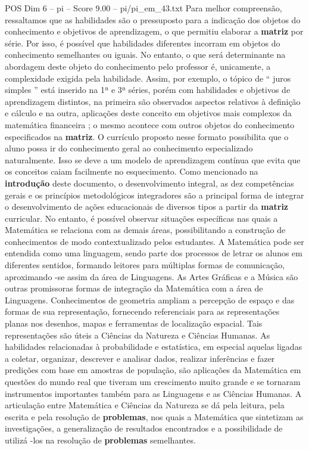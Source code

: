 \begin{textsample}{POS Dim 6 – pi – Score 9.00 – pi/pi\_em\_43.txt}
Para melhor compreensão, ressaltamos que as habilidades são o pressuposto para a indicação dos objetos do conhecimento e objetivos de aprendizagem, o que permitiu elaborar a \textbf{matriz} por série.
Por isso, é possível que habilidades diferentes incorram em objetos do conhecimento semelhantes ou iguais.
No entanto, o que será determinante na abordagem deste objeto do conhecimento pelo professor é, unicamente, a complexidade exigida pela habilidade.
Assim, por exemplo, o tópico de “ juros simples ” está inserido na 1ª e 3ª séries, porém com habilidades e objetivos de aprendizagem distintos, na primeira são observados aspectos relativos à definição e cálculo e na outra, aplicações deste conceito em objetivos mais complexos da matemática financeira ; o mesmo acontece com outros objetos do conhecimento especificados na \textbf{matriz}.
O currículo proposto nesse formato possibilita que o aluno possa ir do conhecimento geral ao conhecimento especializado naturalmente.
Isso se deve a um modelo de aprendizagem contínua que evita que os conceitos caiam facilmente no esquecimento.
Como mencionado na \textbf{introdução} deste documento, o desenvolvimento integral, as dez competências gerais e os princípios metodológicos integradores são a principal forma de integrar o desenvolvimento de ações educacionais de diversos tipos a partir da \textbf{matriz} curricular.
No entanto, é possível observar situações específicas nas quais a Matemática se relaciona com as demais áreas, possibilitando a construção de conhecimentos de modo contextualizado pelos estudantes.
A Matemática pode ser entendida como uma linguagem, sendo parte dos processos de letrar os alunos em diferentes sentidos, formando leitores para múltiplas formas de comunicação, aproximando -se assim da área de Linguagens.
As Artes Gráficas e a Música são outras promissoras formas de integração da Matemática com a área de Linguagens.
Conhecimentos de geometria ampliam a percepção de espaço e das formas de sua representação, fornecendo referenciais para as representações planas nos desenhos, mapas e ferramentas de localização espacial.
Tais representações são úteis a Ciências da Natureza e Ciências Humanas.
As habilidades relacionadas à probabilidade e estatística, em especial aquelas ligadas a coletar, organizar, descrever e analisar dados, realizar inferências e fazer predições com base em amostras de população, são aplicações da Matemática em questões do mundo real que tiveram um crescimento muito grande e se tornaram instrumentos importantes também para as Linguagens e as Ciências Humanas.
A articulação entre Matemática e Ciências da Natureza se dá pela leitura, pela escrita e pela resolução de \textbf{problemas}, nos quais a Matemática que sintetizam as investigações, a generalização de resultados encontrados e a possibilidade de utilizá -los na resolução de \textbf{problemas} semelhantes.

\end{textsample}
